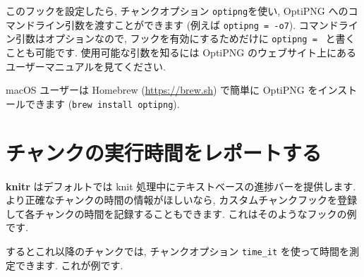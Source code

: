 \documentclass[
  11pt,
  lualatex,
  ja=standard]{bxjsreport}
\newenvironment{Shaded}{\begin{snugshade}}{\end{snugshade}}
\newcommand{\AttributeTok}[1]{\textcolor[rgb]{0.77,0.63,0.00}{#1}}
\newcommand{\CommentTok}[1]{\textcolor[rgb]{0.56,0.35,0.01}{\textit{#1}}}
\newcommand{\ConstantTok}[1]{\textcolor[rgb]{0.00,0.00,0.00}{#1}}
\newcommand{\ControlFlowTok}[1]{\textcolor[rgb]{0.13,0.29,0.53}{\textbf{#1}}}
\newcommand{\FunctionTok}[1]{\textcolor[rgb]{0.00,0.00,0.00}{#1}}
\newcommand{\NormalTok}[1]{#1}
\newcommand{\OtherTok}[1]{\textcolor[rgb]{0.56,0.35,0.01}{#1}}
\newcommand{\SpecialCharTok}[1]{\textcolor[rgb]{0.00,0.00,0.00}{#1}}
\newcommand{\StringTok}[1]{\textcolor[rgb]{0.31,0.60,0.02}{#1}}
\begin{document}
このフックを設定したら, チャンクオプション \texttt{optipng}を使い, OptiPNG へのコマンドライン引数を渡すことができます (例えば \texttt{optipng = \textquotesingle{}-o7\textquotesingle{}}). コマンドライン引数はオプションなので, フックを有効にするためだけに \texttt{optipng = \textquotesingle{}\textquotesingle{}} と書くことも可能です. 使用可能な引数を知るには OptiPNG のウェブサイト上にあるユーザーマニュアルを見てください.

macOS ユーザーは Homebrew (\url{https://brew.sh}) で簡単に OptiPNG をインストールできます (\texttt{brew install optipng}).

\hypertarget{time-chunk}{%
\section{チャンクの実行時間をレポートする}\label{time-chunk}}

\textbf{knitr} はデフォルトでは knit 処理中にテキストベースの進捗バーを提供します. より正確なチャンクの時間の情報がほしいなら, カスタムチャンクフックを登録して各チャンクの時間を記録することもできます. これはそのようなフックの例です.

\begin{Shaded}
\end{Shaded}

するとこれ以降のチャンクでは, チャンクオプション \texttt{time\_it} を使って時間を測定できます. これが例です.
\end{document}
